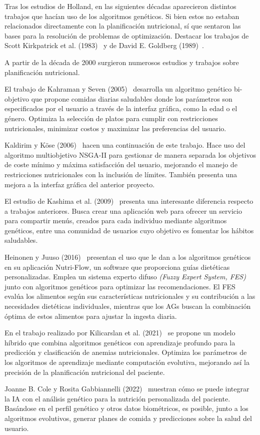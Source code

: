 Tras los estudios de Holland, en las siguientes décadas aparecieron distintos trabajos que hacían uso de los algoritmos genéticos. Si bien estos no estaban relacionados directamente con la planificación nutricional, sí que sentaron las bases para la resolución de problemas de optimización. Destacar los trabajos de Scott Kirkpatrick et al. (1983)~\cite{kirkpatrick1983} y de David E. Goldberg (1989)~\cite{goldberg1989}.

A partir de la década de 2000 surgieron numerosos estudios y trabajos sobre planificación nutricional.

El trabajo de Kahraman y Seven (2005)~\cite{kahraman2005} desarrolla un algoritmo genético bi-objetivo que propone comidas diarias saludables donde los parámetros son especificados por el usuario a través de la interfaz gráfica, como la edad o el género. Optimiza la selección de platos para cumplir con restricciones nutricionales, minimizar costos y maximizar las preferencias del usuario.

Kaldirim y Köse (2006)~\cite{kaldirim2006} hacen una continuación de este trabajo. Hace uso del algoritmo multiobjetivo NSGA-II para gestionar de manera separada los objetivos de coste mínimo y máxima satisfacción del usuario, mejorando el manejo de restricciones nutricionales con la inclusión de límites. También presenta una mejora a la interfaz gráfica del anterior proyecto.

El estudio de Kashima et al. (2009)~\cite{kashima2009} presenta una interesante diferencia respecto a trabajos anteriores. Busca crear una aplicación web para ofrecer un servicio para compartir menús, creados para cada individuo mediante algoritmos genéticos, entre una comunidad de usuarios cuyo objetivo es fomentar los hábitos saludables.

Heinonen y Juuso (2016)~\cite{heinonen2016} presentan el uso que le dan a los algoritmos genéticos en su aplicación Nutri-Flow, un software que proporciona guías dietéticas personalizadas. Emplea un sistema experto difuso \textit{(Fuzzy Expert System, FES)} junto con algoritmos genéticos para optimizar las recomendaciones. El FES evalúa los alimentos según sus características nutricionales y su contribución a las necesidades dietéticas individuales, mientras que los AGs buscan la combinación óptima de estos alimentos para ajustar la ingesta diaria.

En el trabajo realizado por Kilicarslan et al. (2021)~\cite{kilicarslan2021} se propone un modelo híbrido que combina algoritmos genéticos con aprendizaje profundo para la predicción y clasificación de anemias nutricionales. Optimiza los parámetros de los algoritmos de aprendizaje mediante computación evolutiva, mejorando así la precisión de la planificación nutricional del paciente.

Joanne B. Cole y Rosita Gabbiannelli (2022)~\cite{cole2022} muestran cómo se puede integrar la IA con el análisis genético para la nutrición personalizada del paciente. Basándose en el perfil genético y otros datos biométricos, es posible, junto a los algoritmos evolutivos, generar planes de comida y predicciones sobre la salud del usuario.